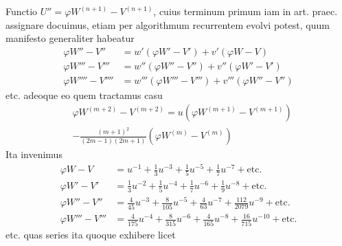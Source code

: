 Functio $U''=\varphi W^{(n+1)}-V^{(n+1)}$, cuius terminum primum iam in art.
praec. assignare docuimus, etiam per algorithmum recurrentem evolvi potest,
quum manifesto generaliter habeatur
\[
\begin{aligned}
\varphi W''-V''&=w'(\varphi W'-V')+v'(\varphi W-V)\\
\varphi W'''-V'''&=w''(\varphi W''-V'')+v''(\varphi W'-V')\\
\varphi W''''-V''''&=w'''(\varphi W'''-V''')+v'''(\varphi W''-V'')
\end{aligned}
\]
etc. adeoque eo quem tractamus casu
\[
\begin{aligned}&\varphi W^{(m+2)}-V^{(m+2)}=u(\varphi W^{(m+1)}-V^{(m+1)})\\[5pt]&-\frac{(m+1)^2}{(2m-1)(2m+1)}(\varphi W^{(m)}-V^{(m)})\end{aligned}
\]
Ita invenimus
\[
\begin{aligned}
\varphi W-V&=u^{-1}+\tfrac13u^{-3}+\tfrac15u^{-5}+\tfrac17u^{-7}+\text{etc.}\\
\varphi W'-V'&=\tfrac13u^{-2}+\tfrac15u^{-4}+\tfrac17u^{-6}+\tfrac19u^{-8}+\text{etc.}\\
\varphi W''-V''&=\tfrac4{45}u^{-3}+\tfrac8{105}u^{-5}+\tfrac4{63}u^{-7}+\tfrac{112}{2079}u^{-9}+\text{etc.}\\
\varphi W'''-V'''&=\tfrac4{175}u^{-4}+\tfrac8{315}u^{-6}+\tfrac4{165}u^{-8}+\tfrac{16}{715}u^{-10}+\text{etc.}
\end{aligned}
\]
etc. quas series ita quoque exhibere licet
